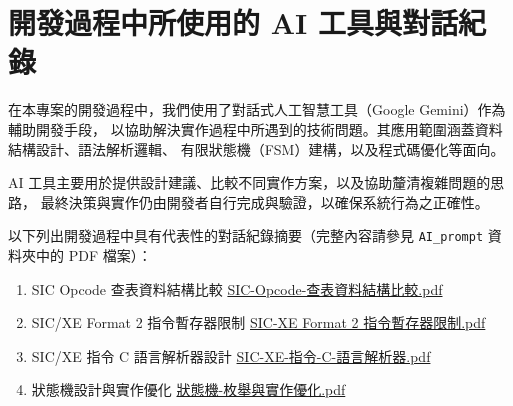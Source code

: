 \chapter{開發過程中所使用的 AI 工具與對話紀錄}

在本專案的開發過程中，我們使用了對話式人工智慧工具（Google Gemini）作為輔助開發手段，
以協助解決實作過程中所遇到的技術問題。其應用範圍涵蓋資料結構設計、語法解析邏輯、
有限狀態機（FSM）建構，以及程式碼優化等面向。

AI 工具主要用於提供設計建議、比較不同實作方案，以及協助釐清複雜問題的思路，
最終決策與實作仍由開發者自行完成與驗證，以確保系統行為之正確性。

以下列出開發過程中具有代表性的對話紀錄摘要（完整內容請參見 \lstinline{AI_prompt} 資料夾中的 PDF 檔案）：

\begin{enumerate}
    \item SIC Opcode 查表資料結構比較
          \href{./AI_prompt/SIC-Opcode-查表資料結構比較.pdf}{SIC-Opcode-查表資料結構比較.pdf}

    \item SIC/XE Format 2 指令暫存器限制
          \href{./AI_prompt/SIC-XE-Format-2-指令暫存器限制.pdf}{SIC-XE Format 2 指令暫存器限制.pdf}

    \item SIC/XE 指令 C 語言解析器設計
          \href{./AI_prompt/SIC-XE-指令-C-語言解析器.pdf}{SIC-XE-指令-C-語言解析器.pdf}

    \item 狀態機設計與實作優化
          \href{./AI_prompt/狀態機-枚舉與實作優化.pdf}{狀態機-枚舉與實作優化.pdf}
\end{enumerate}
